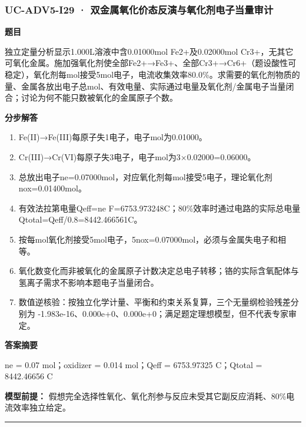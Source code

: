 \documentclass[UTF8,11pt,a4paper]{ctexart}
\begin{document}
\subsubsection*{UC-ADV5-I29 · 双金属氧化价态反演与氧化剂电子当量审计}
\noindent\textbf{题目}\par
独立定量分析显示1.000L溶液中含0.01000mol Fe2+及0.02000mol Cr3+，无其它可氧化金属。施加强氧化剂使全部Fe2+→Fe3+、全部Cr3+→Cr6+（题设酸性可稳定），氧化剂每mol接受5mol电子，电流收集效率80.0\%。求需要的氧化剂物质的量、金属各放出电子总mol、有效电量、实际通过电量及氧化剂/金属电子当量闭合；讨论为何不能只数被氧化的金属原子个数。\par
\medskip\noindent\textbf{分步解答}
\begin{enumerate}
\item Fe(II)→Fe(III)每原子失1电子，电子mol为0.01000。
\item Cr(III)→Cr(VI)每原子失3电子，电子mol为3×0.02000=0.06000。
\item 总放出电子ne=0.07000mol，对应氧化剂每mol接受5电子，理论氧化剂nox=0.01400mol。
\item 有效法拉第电量Qeff=ne F=6753.973248C；80\%效率时通过电路的实际总电量Qtotal=Qeff/0.8=8442.466561C。
\item 按每mol氧化剂接受5mol电子，5nox=0.07000mol，必须与金属失电子和相等。
\item 氧化数变化而非被氧化的金属原子计数决定总电子转移；铬的实际含氧配体与氢离子需求不影响本题电子当量闭合。
\item 数值逆核验：按独立化学计量、平衡和约束关系复算，三个无量纲检验残差分别为 -1.983e-16、0.000e+0、0.000e+0；满足题定理想模型，但不代表专家审定。
\end{enumerate}
\noindent\textbf{答案摘要}\par
ne = 0.07 mol；oxidizer = 0.014 mol；Qeff = 6753.97325 C；Qtotal = 8442.46656 C\par
\noindent\textbf{模型前提：}
假想完全选择性氧化、氧化剂参与反应未受其它副反应消耗、80\%电流效率独立给定。\par
\medskip\hrule\medskip
{}
\end{document}
